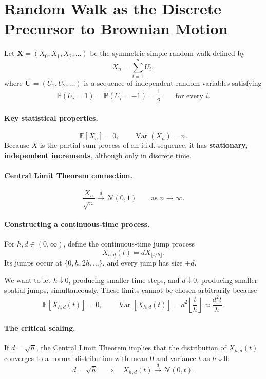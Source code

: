 \documentclass[12pt,openany]{book}
\theoremstyle{definition}
\theoremstyle{remark}
\begin{document}
\section{Random Walk as the Discrete Precursor to Brownian Motion}

Let \(\boldsymbol{X}=(X_0,X_1,X_2,\ldots)\) be the symmetric simple random
walk defined by
\[
X_n=\sum_{i=1}^{n}U_i,
\]
where \(\boldsymbol{U}=(U_1,U_2,\ldots)\) is a sequence of independent random
variables satisfying
\[
\mathbb{P}(U_i=1)=\mathbb{P}(U_i=-1)=\frac{1}{2}
\qquad\text{for every }i.
\]

\paragraph{Key statistical properties.}
\[
\mathbb{E}[X_n]=0,
\qquad
\operatorname{Var}(X_n)=n.
\]
Because \(X\) is the partial-sum process of an i.i.d. sequence, it has
\textbf{stationary, independent increments}, although only in discrete time.

\paragraph{Central Limit Theorem connection.}
\[
\frac{X_n}{\sqrt{n}}
\xrightarrow{d}
\mathcal{N}(0,1)
\qquad\text{as }n\to\infty.
\]

\paragraph{Constructing a continuous-time process.}
For \(h,d\in(0,\infty)\), define the continuous-time jump process
\[
X_{h,d}(t)=dX_{\lfloor t/h\rfloor}.
\]
Its jumps occur at \(\{0,h,2h,\ldots\}\), and every jump has size \(\pm d\).

We want to let \(h\downarrow0\), producing smaller time steps, and
\(d\downarrow0\), producing smaller spatial jumps, simultaneously. These
limits cannot be chosen arbitrarily because
\[
\mathbb{E}[X_{h,d}(t)]=0,
\qquad
\operatorname{Var}[X_{h,d}(t)]
=d^2\left\lfloor\frac{t}{h}\right\rfloor
\approx\frac{d^2t}{h}.
\]

\paragraph{The critical scaling.}
If \(d=\sqrt{h}\), the Central Limit Theorem implies that the distribution of
\(X_{h,d}(t)\) converges to a normal distribution with mean 0 and variance
\(t\) as \(h\downarrow0\):
\[
\boxed{
d=\sqrt{h}
\quad\Longrightarrow\quad
X_{h,d}(t)\xrightarrow{d}\mathcal{N}(0,t)
}.
\]
\end{document}
